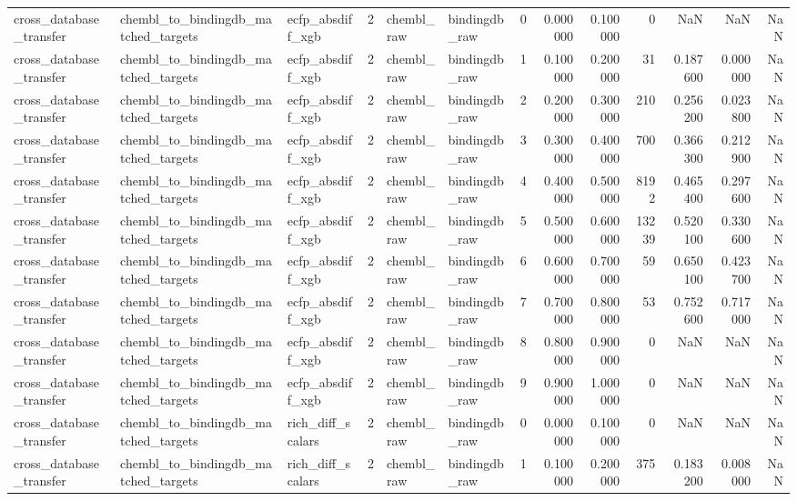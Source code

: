\begin{longtable}{lllrllrrrrrrr}
cross\_database\_transfer & chembl\_to\_bindingdb\_matched\_targets & ecfp\_absdiff\_xgb & 2 & chembl\_raw & bindingdb\_raw & 0 & 0.000000 & 0.100000 & 0 & NaN & NaN & NaN \\
cross\_database\_transfer & chembl\_to\_bindingdb\_matched\_targets & ecfp\_absdiff\_xgb & 2 & chembl\_raw & bindingdb\_raw & 1 & 0.100000 & 0.200000 & 31 & 0.187600 & 0.000000 & NaN \\
cross\_database\_transfer & chembl\_to\_bindingdb\_matched\_targets & ecfp\_absdiff\_xgb & 2 & chembl\_raw & bindingdb\_raw & 2 & 0.200000 & 0.300000 & 210 & 0.256200 & 0.023800 & NaN \\
cross\_database\_transfer & chembl\_to\_bindingdb\_matched\_targets & ecfp\_absdiff\_xgb & 2 & chembl\_raw & bindingdb\_raw & 3 & 0.300000 & 0.400000 & 700 & 0.366300 & 0.212900 & NaN \\
cross\_database\_transfer & chembl\_to\_bindingdb\_matched\_targets & ecfp\_absdiff\_xgb & 2 & chembl\_raw & bindingdb\_raw & 4 & 0.400000 & 0.500000 & 8192 & 0.465400 & 0.297600 & NaN \\
cross\_database\_transfer & chembl\_to\_bindingdb\_matched\_targets & ecfp\_absdiff\_xgb & 2 & chembl\_raw & bindingdb\_raw & 5 & 0.500000 & 0.600000 & 13239 & 0.520100 & 0.330600 & NaN \\
cross\_database\_transfer & chembl\_to\_bindingdb\_matched\_targets & ecfp\_absdiff\_xgb & 2 & chembl\_raw & bindingdb\_raw & 6 & 0.600000 & 0.700000 & 59 & 0.650100 & 0.423700 & NaN \\
cross\_database\_transfer & chembl\_to\_bindingdb\_matched\_targets & ecfp\_absdiff\_xgb & 2 & chembl\_raw & bindingdb\_raw & 7 & 0.700000 & 0.800000 & 53 & 0.752600 & 0.717000 & NaN \\
cross\_database\_transfer & chembl\_to\_bindingdb\_matched\_targets & ecfp\_absdiff\_xgb & 2 & chembl\_raw & bindingdb\_raw & 8 & 0.800000 & 0.900000 & 0 & NaN & NaN & NaN \\
cross\_database\_transfer & chembl\_to\_bindingdb\_matched\_targets & ecfp\_absdiff\_xgb & 2 & chembl\_raw & bindingdb\_raw & 9 & 0.900000 & 1.000000 & 0 & NaN & NaN & NaN \\
cross\_database\_transfer & chembl\_to\_bindingdb\_matched\_targets & rich\_diff\_scalars & 2 & chembl\_raw & bindingdb\_raw & 0 & 0.000000 & 0.100000 & 0 & NaN & NaN & NaN \\
cross\_database\_transfer & chembl\_to\_bindingdb\_matched\_targets & rich\_diff\_scalars & 2 & chembl\_raw & bindingdb\_raw & 1 & 0.100000 & 0.200000 & 375 & 0.183200 & 0.008000 & NaN \\

\end{longtable}
